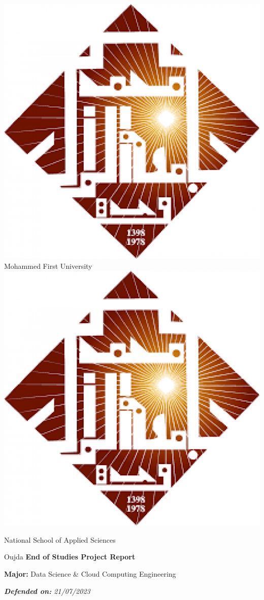 \documentclass[a4paper,12pt,twoside]{report}
\begin{document}
\begin{titlepage}

\selectfont

\begin{center}
    \includegraphics[scale=0.1]{logos/ump}\hfill
    \LARGE Mohammed First University\hfill
    \includegraphics[scale=0.1]{logos/ump}\par
    \Large National School of Applied Sciences\par
    \Large Oujda\vfill
    \Large\textbf{End of Studies Project Report}\par
    \large\textbf{Major:} Data Science \& Cloud Computing Engineering\par
    \textit{\textbf{Defended on:} 21/07/2023}\par
\end{center}


\end{titlepage}
\end{document}
